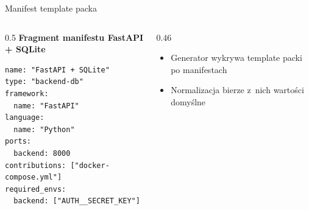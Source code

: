 \documentclass[aspectratio=169, 11pt]{beamer}
\begin{document}
\begin{frame}[fragile]{Manifest template packa}
  \begin{columns}[T]
    \begin{column}{0.5\textwidth}
      \textbf{Fragment manifestu FastAPI + SQLite}
\begin{lstlisting}[style=code]
name: "FastAPI + SQLite"
type: "backend-db"
framework:
  name: "FastAPI"
language:
  name: "Python"
ports:
  backend: 8000
contributions: ["docker-compose.yml"]
required_envs:
  backend: ["AUTH__SECRET_KEY"]
\end{lstlisting}
    \end{column}
    \begin{column}{0.46\textwidth}
      \vspace{6mm}
      \begin{itemize}
        \item Generator wykrywa template packi po manifestach
        \item Normalizacja bierze z~nich wartości domyślne
      \end{itemize}
    \end{column}
  \end{columns}
\end{frame}
\end{document}
